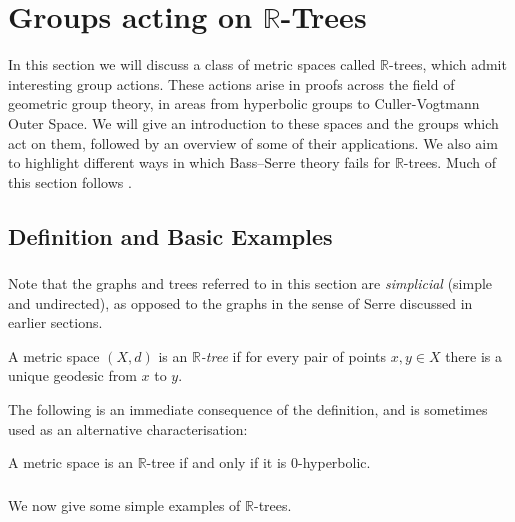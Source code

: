 \section{Groups acting on $\mathbb{R}$-Trees}
\label{sec:groups_acting_on_R_trees}

In this section we will discuss a class of metric spaces called $\mathbb{R}$-trees, which admit interesting group actions. These actions arise in proofs across the field of geometric group theory, in areas from hyperbolic groups to Culler-Vogtmann Outer Space. We will give an introduction to these spaces and the groups which act on them, followed by an overview of some of their applications. We also aim to highlight different ways in which Bass--Serre theory fails for $\mathbb{R}$-trees. Much of this section follows \cite{Bestvina_trees}.
\subsection{Definition and Basic Examples}
\subsubsection{} Note that the graphs and trees referred to in this section are \emph{simplicial} (simple and undirected), as opposed to the graphs in the sense of Serre discussed in earlier sections. 
\begin{definition}
    A metric space $(X,d)$ is an \emph{$\mathbb{R}$-tree} if for every pair of points $x,y\in X$ there is a unique geodesic from $x$ to $y$.
\end{definition}

The following is an immediate consequence of the definition, and is sometimes used as an alternative characterisation:

\begin{proposition}
    A metric space is an $\mathbb{R}$-tree if and only if it is 0-hyperbolic.
\end{proposition}

\subsubsection{} We now give some simple examples of $\mathbb{R}$-trees.

